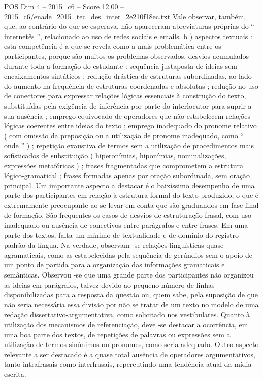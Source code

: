 \begin{textsample}{POS Dim 4 – 2015\_c6 – Score 12.00 – 2015\_c6/enade\_2015\_tec\_des\_inter\_2e210f18ec.txt}
Vale observar, também, que, ao contrário do que se esperava, não apareceram abreviaturas próprias do “ internetês ”, relacionado ao uso de redes sociais e emails. b ) aspectos textuais : esta competência é a que se revela como a mais problemática entre os participantes, porque são muitos os problemas observados, desvios acumulados durante toda a formação do estudante : sequência justaposta de ideias sem encaixamentos sintáticos ; redução drástica de estruturas subordinadas, ao lado do aumento na frequência de estruturas coordenadas e absolutas ; redução no uso de conectores para expressar relações lógicas essenciais à construção do texto, substituídas pela exigência de inferência por parte do interlocutor para suprir a sua ausência ; emprego equivocado de operadores que não estabelecem relações lógicas coerentes entre ideias do texto ; emprego inadequado do pronome relativo ( com omissão da preposição ou a utilização de pronome inadequado, como “ onde ” ) ; repetição exaustiva de termos sem a utilização de procedimentos mais sofisticados de substituição ( hiperonímias, hiponímias, nominalizações, expressões metafóricas ) ; frases fragmentadas que comprometem a estrutura lógico-gramatical ; frases formadas apenas por oração subordinada, sem oração principal.
Um importante aspecto a destacar é o baixíssimo desempenho de uma parte dos participantes em relação à estrutura formal do texto produzido, o que é extremamente preocupante ao se levar em conta que são graduandos em fase final de formação.
São frequentes os casos de desvios de estruturação frasal, com uso inadequado ou ausência de conectivos entre parágrafos e entre frases.
Em uma parte dos textos, falta um mínimo de textualidade e de domínio do registro padrão da língua.
Na verdade, observam -se relações linguísticas quase agramaticais, como as estabelecidas pela sequência de gerúndios sem o apoio de um ponto de partida para a organização das informações gramaticais e semânticas.
Observou -se que uma grande parte dos participantes não organizou as ideias em parágrafos, talvez devido ao pequeno número de linhas disponibilizadas para a resposta da questão ou, quem sabe, pela suposição de que não seria necessária essa divisão por não se tratar de um texto no modelo de uma redação dissertativo-argumentativa, como solicitado nos vestibulares.
Quanto à utilização dos mecanismos de referenciação, deve -se destacar a ocorrência, em uma boa parte dos textos, de repetições de palavras ou expressões sem a utilização de termos sinônimos ou pronomes, como seria adequado.
Outro aspecto relevante a ser destacado é a quase total ausência de operadores argumentativos, tanto intrafrasais como interfrasais, repercutindo uma tendência atual da mídia escrita.

\end{textsample}
